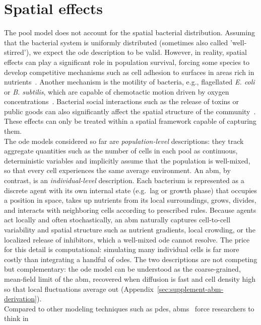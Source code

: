 \documentclass[10pt,1p,authoryear]{elsarticle}
\numberwithin{equation}{section}
\begin{document}
\section{Spatial effects}
The pool model does not account for the spatial bacterial distribution.
Assuming that the bacterial system is uniformly distributed (sometimes also called 'well-stirred'),
we expect the \ac{ode} description to be valid.
However, in reality, spatial effects can play a significant role in population survival, forcing some
species to develop competitive mechanisms such as cell adhesion to surfaces in areas rich in
nutrients~\citep{htuson_bacteriasurface_2013}.
Another mechanism is the motility of bacteria, e.g., flagellated \textit{E. coli} or
\textit{B. subtilis}, which are capable of chemotactic motion driven by oxygen
concentrations~\citep{decoene_microscopic_2011}. Bacterial social interactions such as the release of toxins or public goods can also significantly affect the spatial structure of the community~\citep{blanchard_bacterial_2015}.
These effects can only be treated within a spatial framework capable of capturing them.\\
%
The \ac{ode} models considered so far are \emph{population-level}
descriptions: they track aggregate quantities such as the number of cells in
each pool as continuous, deterministic variables and implicitly assume that the
population is well-mixed, so that every cell experiences the same average
environment. An \ac{abm}, by contrast, is an \emph{individual-level} description.
Each bacterium is represented as a discrete agent with its own internal state
(e.g.\ lag or growth phase) that occupies a position in space, takes up nutrients
from its local surroundings, grows, divides, and interacts with neighboring
cells according to prescribed rules. Because agents act locally and often
stochastically, an \ac{abm} naturally captures cell-to-cell variability and
spatial structure such as nutrient gradients, local crowding, or the localized
release of inhibitors, which a well-mixed \ac{ode} cannot resolve. The price for
this detail is computational: simulating many individual cells is far more costly
than integrating a handful of \acp{ode}. The two descriptions are not competing
but complementary: the \ac{ode} model can be understood as the coarse-grained,
mean-field limit of the \ac{abm}, recovered when diffusion is fast and cell
density high so that local fluctuations average out (Appendix~\ref{sec:supplement-abm-derivation}).\\
%
Compared to other modeling techniques such as \acp{pde}, \acp{abm}~\citep{nagarajan_agent-based_2022-1} force researchers to think in
\end{document}
